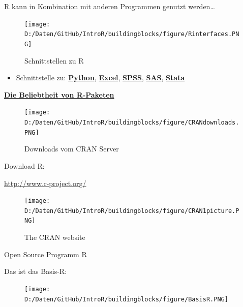 \documentclass[ignorenonframetext,]{beamer}
\providecommand{\tightlist}{%
  \setlength{\itemsep}{0pt}\setlength{\parskip}{0pt}}
\begin{document}
\begin{frame}{R kann in Kombination mit anderen Programmen genutzt
werden\ldots{}}

\begin{figure}
\centering
\texttt{[image: D:/Daten/GitHub/IntroR/buildingblocks/figure/Rinterfaces.PNG]}
\caption{Schnittstellen zu R}
\end{figure}

\begin{itemize}
\tightlist
\item
  Schnittstelle zu:
  \href{https://cran.r-project.org/web/packages/reticulate/vignettes/calling_python.html}{\textbf{Python}},
  \href{https://www.springer.com/de/book/9781441900517}{\textbf{Excel}},
  \href{https://www.ibm.com/support/knowledgecenter/en/SSFUEU_7.2.0/com.ibm.swg.ba.cognos.op_capmod_ig.7.2.0.doc/t_essentials_for_r_statistics.html}{\textbf{SPSS}},
  \href{https://cran.r-project.org/web/packages/SASmixed/index.html}{\textbf{SAS}},
  \href{https://cran.r-project.org/web/packages/RStata/index.html}{\textbf{Stata}}
\end{itemize}

\end{frame}

\begin{frame}{\href{https://gallery.shinyapps.io/cran-gauge/}{\textbf{Die
Beliebtheit von R-Paketen}}}

\begin{figure}
\centering
\texttt{[image: D:/Daten/GitHub/IntroR/buildingblocks/figure/CRANdownloads.PNG]}
\caption{Downloads vom CRAN Server}
\end{figure}

\end{frame}

\begin{frame}{Download R:}

\url{http://www.r-project.org/}

\begin{figure}
\centering
\texttt{[image: D:/Daten/GitHub/IntroR/buildingblocks/figure/CRAN1picture.PNG]}
\caption{The CRAN website}
\end{figure}

\end{frame}

\begin{frame}{Open Source Programm R}

\begin{block}{Das ist das Basis-R:}

\begin{figure}
\centering
\texttt{[image: D:/Daten/GitHub/IntroR/buildingblocks/figure/BasisR.PNG]}
\caption{}
\end{figure}

\end{block}

\end{frame}
\end{document}

